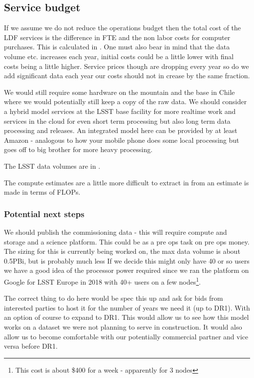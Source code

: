 \subsection{Service budget}

If we assume we do not reduce the operations budget then the total cost of the \gls{LDF} services is
the difference in \gls{FTE} and the non labor costs for computer purchases.
This is calculated in . One must also bear in mind that the data volume etc. increases each year,
initial costs could be a little lower with final costs being a little higher. Service prices though are dropping every year so do we add significant data each year our costs should not in crease by the same fraction.




We would still require some hardware on the mountain and the base in Chile where we would potentially still keep a copy of the raw data.
We should consider a hybrid model services at the \gls{LSST} base facility for more realtime work and services in the \gls{cloud} for even short term processing but also long term data processing and releases. An integrated model here can be provided by at least Amazon - analogous to how your mobile phone does some local processing but goes off to big brother for more heavy processing.

The  \gls{LSST} data volumes are in  .





The compute estimates are a little more difficult to extract in  from 
an estimate is made in terms of FLOPs.



\subsubsection {Potential next steps}\label{sec:next}

We should publish the commissioning data - this will require compute and storage and a science platform. This
could be as a pre ops task on pre ops money.
The sizing for this is currently being worked on, the max data volume is about 0.5PBi, but is probably much less
If we decide this might only have 40 or so users we have a good idea of the processor power 
required since we ran the platform on Google for \gls{LSST} Europe in 2018 with 40+ users on a few 
nodes\footnote{This cost is about \$400 for a week - apparently for 3 nodes}.

The correct thing to do here would be spec this up and ask for bids from interested parties 
to host it for the number of years we need it (up to DR1). With an option of course to expand to DR1. 
This would allow us to see how this model works on a dataset we were not planning to serve in construction. 
It would also allow us to become comfortable with our potentially commercial partner and vice versa before DR1.
